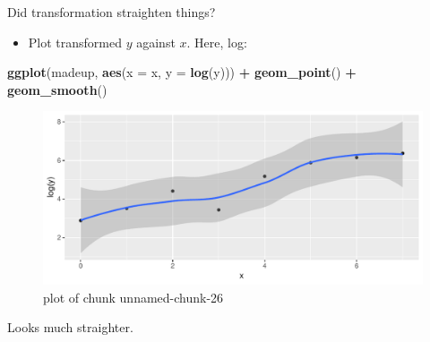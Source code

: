 \documentclass[ignorenonframetext,]{beamer}
\newenvironment{Shaded}{\begin{snugshade}}{\end{snugshade}}
\newcommand{\DataTypeTok}[1]{\textcolor[rgb]{0.13,0.29,0.53}{#1}}
\newcommand{\KeywordTok}[1]{\textcolor[rgb]{0.13,0.29,0.53}{\textbf{#1}}}
\newcommand{\NormalTok}[1]{#1}
\newcommand{\OperatorTok}[1]{\textcolor[rgb]{0.81,0.36,0.00}{\textbf{#1}}}
\newcommand{\StringTok}[1]{\textcolor[rgb]{0.31,0.60,0.02}{#1}}
\providecommand{\tightlist}{%
  \setlength{\itemsep}{0pt}\setlength{\parskip}{0pt}}
\begin{document}
\begin{frame}[fragile]{Did transformation straighten things?}
\protect\hypertarget{did-transformation-straighten-things}{}

\begin{itemize}
\tightlist
\item
  Plot transformed \(y\) against \(x\). Here, log:
\end{itemize}

\begin{Shaded}
\begin{Highlighting}[]
\KeywordTok{ggplot}\NormalTok{(madeup, }\KeywordTok{aes}\NormalTok{(}\DataTypeTok{x =}\NormalTok{ x, }\DataTypeTok{y =} \KeywordTok{log}\NormalTok{(y))) }\OperatorTok{+}\StringTok{ }\KeywordTok{geom_point}\NormalTok{() }\OperatorTok{+}
\StringTok{  }\KeywordTok{geom_smooth}\NormalTok{()}
\end{Highlighting}
\end{Shaded}

\begin{figure}
\centering
\includegraphics{figure/unnamed-chunk-26-1.pdf}
\caption{plot of chunk unnamed-chunk-26}
\end{figure}

Looks much straighter.

\end{frame}
\end{document}
